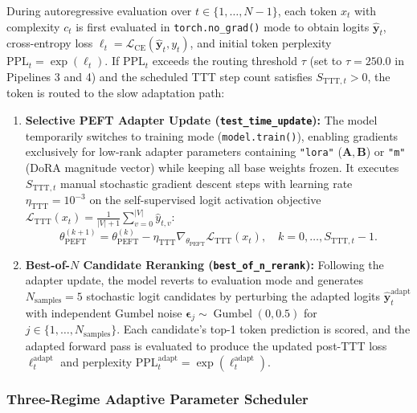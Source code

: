 \documentclass{interact}
\begin{document}
During autoregressive evaluation over $t \in \{1, \dots, N-1\}$, each token $x_t$ with complexity $c_t$ is first evaluated in \texttt{torch.no\_grad()} mode to obtain logits $\hat{\mathbf{y}}_t$, cross-entropy loss $\ell_t = \mathcal{L}_{\text{CE}}(\hat{\mathbf{y}}_t, y_t)$, and initial token perplexity $\text{PPL}_t = \exp(\ell_t)$. If $\text{PPL}_t$ exceeds the routing threshold $\tau$ (set to $\tau = 250.0$ in Pipelines 3 and 4) and the scheduled TTT step count satisfies $S_{\text{TTT},t} > 0$, the token is routed to the slow adaptation path:
\begin{enumerate}
    \item \textbf{Selective PEFT Adapter Update (\texttt{test\_time\_update}):} The model temporarily switches to training mode (\texttt{model.train()}), enabling gradients exclusively for low-rank adapter parameters containing \texttt{"lora"} ($\mathbf{A}, \mathbf{B}$) or \texttt{"m"} (DoRA magnitude vector) while keeping all base weights frozen. It executes $S_{\text{TTT},t}$ manual stochastic gradient descent steps with learning rate $\eta_{\text{TTT}} = 10^{-3}$ on the self-supervised logit activation objective $\mathcal{L}_{\text{TTT}}(x_t) = \frac{1}{|V|+1}\sum_{v=0}^{|V|} \hat{y}_{t,v}$:
          \begin{equation}
              \theta_{\text{PEFT}}^{(k+1)} = \theta_{\text{PEFT}}^{(k)} - \eta_{\text{TTT}} \nabla_{\theta_{\text{PEFT}}} \mathcal{L}_{\text{TTT}}(x_t), \quad k = 0, \dots, S_{\text{TTT},t}-1.
              \label{eq:ttt_sgd}
          \end{equation}
    \item \textbf{Best-of-$N$ Candidate Reranking (\texttt{best\_of\_n\_rerank}):} Following the adapter update, the model reverts to evaluation mode and generates $N_{\text{samples}} = 5$ stochastic logit candidates by perturbing the adapted logits $\hat{\mathbf{y}}_t^{\text{adapt}}$ with independent Gumbel noise $\boldsymbol{\epsilon}_j \sim \operatorname{Gumbel}(0, 0.5)$ for $j \in \{1, \dots, N_{\text{samples}}\}$. Each candidate's top-1 token prediction is scored, and the adapted forward pass is evaluated to produce the updated post-TTT loss $\ell_t^{\text{adapt}}$ and perplexity $\text{PPL}_t^{\text{adapt}} = \exp(\ell_t^{\text{adapt}})$.
\end{enumerate}

\subsubsection{Three-Regime Adaptive Parameter Scheduler}
\end{document}
